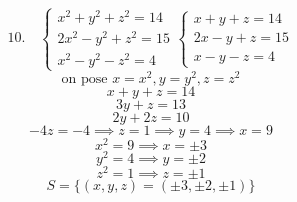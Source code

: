 \documentclass{article}
\begin{document}
\[
\text{10.} \quad
\begin{cases}
x^2+y^2+z^2=14 \\
2x^2-y^2+z^2=15 \\
x^2-y^2-z^2=4
\end{cases}
\begin{cases}
x+y+z=14 \\
2x-y+z=15 \\
x-y-z=4
\end{cases}
\]
\[
\text{on pose } x=x^2, y=y^2, z=z^2
\]
\[
x + y + z = 14
\]
\[
3y+z=13
\]
\[
2y+2z=10
\]
\[
-4z=-4 \implies z=1 \implies y=4 \implies x=9
\]
\[
x^2=9 \implies x=\pm 3
\]
\[
y^2=4 \implies y=\pm 2
\]
\[
z^2=1 \implies z=\pm 1
\]
\[
S=\{(x,y,z)=(\pm 3, \pm 2, \pm 1)\}
\]
\end{document}
